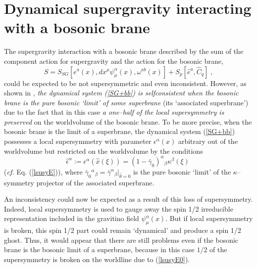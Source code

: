 \documentclass[a4paper,11pt]{article}
\begin{document}
\section{Dynamical supergravity interacting with a bosonic brane} 

The supergravity interaction with a bosonic brane described by the sum of 
the component action for supergravity and the action for the bosonic brane,  
\begin{equation}\label{SG+bb}
S= 
S_{SG}[e^a(x), dx^\mu \psi_\mu^\alpha(x) , \omega^{ab}(x)] + 
S_p[\hat{e}^a, \hat{C}_{q}]
\;  ,
\end{equation}
could be expected to be not supersymmetric and even inconsistent. However, 
as shown in  \cite{BdAI1}, {\sl the dynamical system  (\ref{SG+bb}) is 
selfconsistent when the bosonic brane is the pure bosonic `limit' of some 
superbrane} (its `associated superbrane') due to the fact 
that in this case {\sl a one--half of the local supersymmetry 
is preserved} on the worldvolume of the bosonic brane. 
To be more precise, when the bosonic brane is the limit of 
a superbrane, the dynamical system 
(\ref{SG+bb}) possesses a local supersymmetry with parameter 
$\epsilon^{\alpha}(x)$  arbitrary out of the worldvolume 
but restricted on the worldvolume by the conditions 
\begin{equation}
  \label{lsusyE0} 
\hat{\epsilon}^{\alpha}:= \epsilon^{\alpha}(\hat{x}(\xi)) 
= (1-\bar{\gamma}_0)^{\alpha}{}_{\beta}\kappa^{\beta}(\xi) \; 
\end{equation}
({\it cf.} Eq. (\ref{lsusyE})), 
where $\bar{\gamma}_0{}^{\alpha}{}_{\beta}= 
\bar{\gamma}^{\alpha}{}_{\beta}\vert_{\hat{\theta}=0}$ is the 
pure bosonic `limit' of the $\kappa$--symmetry projector 
of the associated superbrane.

An inconsistency could now be expected as a result of this loss of  
supersymmetry. Indeed, local supersymmetry is used to gauge away the 
spin 1/2 irreducible representation included in  the gravitino field 
$\psi_\mu^\alpha(x)$. But if local supersymmetry is broken, this 
spin 1/2 part could remain `dynamical' and produce a spin 1/2 ghost. 
Thus, it would appear that there are still problems even if 
the bosonic brane is the bosonic limit of a superbrane, because 
in this case $1/2$ of the supersymmetry is broken on the worldline 
due to 
(\ref{lsusyE0}).  
\end{document}
